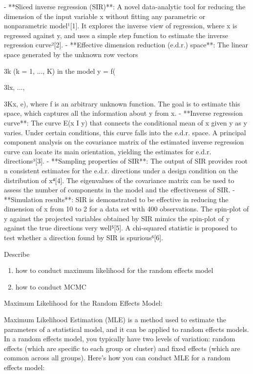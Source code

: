 \documentclass[UTF8,a4paper,10pt]{article}
\begin{document}
- **Sliced inverse regression (SIR)**: A novel data-analytic tool for reducing the dimension of the input variable x without fitting any parametric or nonparametric model¹[1]. It explores the inverse view of regression, where x is regressed against y, and uses a simple step function to estimate the inverse regression curve²[2].
- **Effective dimension reduction (e.d.r.) space**: The linear space generated by the unknown row vectors {3k (k = 1, ..., K) in the model y = f({3lx, ..., {3Kx, e), where f is an arbitrary unknown function. The goal is to estimate this space, which captures all the information about y from x.
- **Inverse regression curve**: The curve E(x I y) that connects the conditional mean of x given y as y varies. Under certain conditions, this curve falls into the e.d.r. space. A principal component analysis on the covariance matrix of the estimated inverse regression curve can locate its main orientation, yielding the estimates for e.d.r. directions³[3].
- **Sampling properties of SIR**: The output of SIR provides root n consistent estimates for the e.d.r. directions under a design condition on the distribution of x⁴[4]. The eigenvalues of the covariance matrix can be used to assess the number of components in the model and the effectiveness of SIR.
- **Simulation results**: SIR is demonstrated to be effective in reducing the dimension of x from 10 to 2 for a data set with 400 observations. The spin-plot of y against the projected variables obtained by SIR mimics the spin-plot of y against the true directions very well⁵[5]. A chi-squared statistic is proposed to test whether a direction found by SIR is spurious⁶[6].

\begin{Problem}[]{}
  Describe
  \begin{enumerate}
    \item how to conduct  maximum likelihood  for the random effects model
    \item how to conduct  MCMC
  \end{enumerate}
    
  \end{Problem}
  
  Maximum Likelihood for the Random Effects Model:

Maximum Likelihood Estimation (MLE) is a method used to estimate the parameters of a statistical model, and it can be applied to random effects models. In a random effects model, you typically have two levels of variation: random effects (which are specific to each group or cluster) and fixed effects (which are common across all groups). Here's how you can conduct MLE for a random effects model:

}}}
\end{document}

